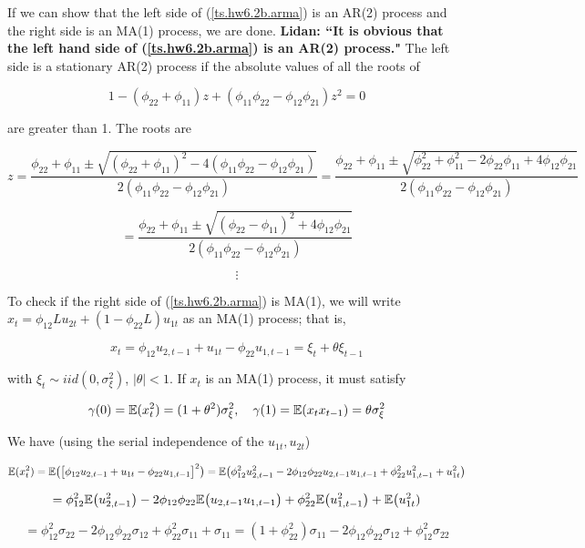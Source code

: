 \begin{enumerate}[(a)]
If we can show that the left side of (\ref{ts.hw6.2b.arma}) is an AR(2) process and the right side is an MA(1) process, we are done. \textbf{Lidan: ``It is obvious that the left hand side of (\ref{ts.hw6.2b.arma}) is an AR(2) process."} The left side is a stationary AR(2) process if the absolute values of all the roots of 

\[
1 - (\phi_{22} + \phi_{11})z+ (\phi_{11}\phi_{22} - \phi_{12}\phi_{21}) z^2 = 0
\]

are greater than 1. The roots are 

\[
z = \frac{\phi_{22} + \phi_{11} \pm \sqrt{(\phi_{22} + \phi_{11})^2 - 4(\phi_{11}\phi_{22} - \phi_{12}\phi_{21})}}{2(\phi_{11}\phi_{22} - \phi_{12}\phi_{21})} = \frac{\phi_{22} + \phi_{11} \pm \sqrt{\phi_{22}^2 + \phi_{11}^2 - 2 \phi_{22}\phi_{11}+ 4\phi_{12}\phi_{21}}}{2(\phi_{11}\phi_{22} - \phi_{12}\phi_{21})}
\]

\[
= \frac{\phi_{22} + \phi_{11} \pm \sqrt{(\phi_{22} - \phi_{11})^2 + 4\phi_{12}\phi_{21}}}{2(\phi_{11}\phi_{22} - \phi_{12}\phi_{21})}
\]

\[
\vdots
\]

To check if the right side of (\ref{ts.hw6.2b.arma}) is MA(1), we will write \(x_t = \phi_{12}L u_{2t} + (1 - \phi_{22}L)u_{1t}\) as an MA(1) process; that is,

\[
x_t = \phi_{12} u_{2,t-1} +u_{1t}   - \phi_{22}u_{1,t-1} = \xi_t + \theta \xi_{t-1}
\]

with \(\xi_t \sim iid(0, \sigma_{\xi}^2)\), \(|\theta| < 1\). If \(x_t\) is an MA(1) process, it must satisfy

\[
\gamma(0) = \mathbb{E}(x_t^2) = (1 + \theta^2)\sigma_{\xi}^2, \ \ \ \gamma(1) = \mathbb{E}(x_t x_{t-1}) = \theta \sigma_{\xi}^2 
\]

We have (using the serial independence of the \(u_{1t}, u_{2t}\))



\[
\mathbb{E}(x_t^2) = \mathbb{E}\big( \big[\phi_{12} u_{2,t-1} +u_{1t}   - \phi_{22}u_{1,t-1} \big]^2 \big)  = \mathbb{E}\big(\phi_{12}^2 u_{2,t-1}^2 -2 \phi_{12}\phi_{22} u_{2,t-1}u_{1,t-1} +  \phi_{22}^2u_{1,t-1} ^2  + u_{1t}^2\big) 
\]

\[
= \phi_{12}^2 \mathbb{E}\big(u_{2,t-1}^2\big) -2 \phi_{12}\phi_{22} \mathbb{E} \big(u_{2,t-1}u_{1,t-1}\big)  +  \phi_{22}^2\mathbb{E} \big(u_{1,t-1} ^2  \big) + \mathbb{E} \big(u_{1t}^2 ) 
\]


\[
= \phi_{12}^2 \sigma_{22} - 2 \phi_{12} \phi_{22} \sigma_{12}  + \phi_{22}^2 \sigma_{11} +\sigma_{11}  = ( 1 + \phi_{22}^2 )\sigma_{11}  - 2 \phi_{12} \phi_{22} \sigma_{12} +  \phi_{12}^2 \sigma_{22} 
\]


\end{enumerate}

